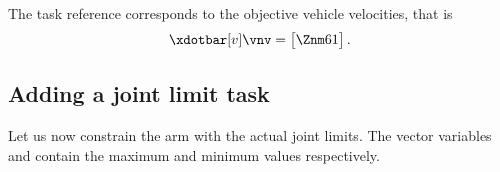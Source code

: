 \begin{parts}
\begin{solutionorbox}
			The task reference corresponds to the objective vehicle
			velocities, that is
			\[
				\xdotbar[v]\vnv = \begin{bmatrix}
					\Znm61
				\end{bmatrix}
				\mathrm{.}
			\]
		\end{solutionorbox}

	\end{parts}

	\subsection{Adding a joint limit task}
	\question
	Let us now constrain the arm with the actual joint limits. The vector variables
	 and  contain the maximum and minimum
	values respectively.

